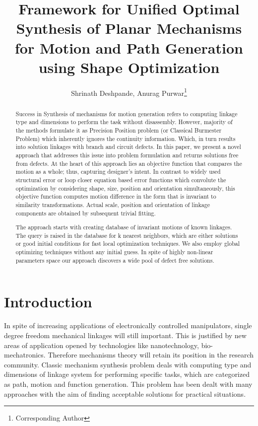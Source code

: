 \documentclass[twocolumn,10pt]{asme2e}
\title{Framework for Unified Optimal Synthesis of Planar Mechanisms for Motion and Path Generation using Shape Optimization}
\author{Shrinath Deshpande, Anurag Purwar\footnote{Corresponding Author}\\
    \affiliation{
    Computer-Aided Design and Innovation Lab \\
    Department of Mechanical Engineering\\
    Stony Brook University\\
    Stony Brook, New York, 11794-2300
    }
   }
\begin{document}
\maketitle

\begin{abstract}

Success in Synthesis of mechanisms for motion generation refers to computing linkage type and dimensions to perform the task without disassembly.
However, majority of the methods formulate it as Precision Position problem (or Classical Burmester Problem) which inherently ignores the continuity information.
Which, in turn results into solution linkages with branch and circuit defects.
In this paper, we present a novel approach that addresses this issue into problem formulation and returns solutions free from defects.
At the heart of this approach lies an objective function that compares the motion as a whole; thus, capturing designer's intent.
In contrast to widely used structural error or loop closer equation based error functions which convolute the optimization by considering shape, size, position and orientation simultaneously, this objective function computes motion difference in the form that is invariant to similarity transformations.
Actual scale, position and orientation of linkage components are obtained by subsequent trivial fitting.

The approach starts with creating database of invariant motions of known linkages. The query is raised in the database for k nearest neighbors, which are either solutions or good initial conditions for fast local optimization techniques. We also employ global optimizing techniques without any initial guess. In spite of highly non-linear parameters space our approach discovers a wide pool of defect free solutions.
\end{abstract}

\section{Introduction}
In spite of increasing applications of electronically controlled manipulators, single degree freedom mechanical linkages will still important.
This is justified by new areas of application opened by technologies like nanotechnology, bio-mechatronics.
Therefore mechanisms theory will retain its position in the research community.
Classic mechanism synthesis problem deals with computing type and dimensions of linkage system for performing specific tasks, which are categorized as path, motion and function generation.
This problem has been dealt with many approaches with the aim of finding acceptable solutions for practical situations.
\end{document}
